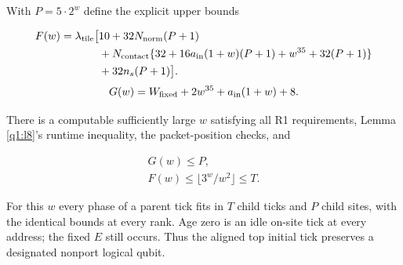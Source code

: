\begin{lemma}
With \(P=5\cdot 2^{w}\) define the explicit upper bounds

\begin{equation}\label{q1:e10.1}
\begin{aligned}
F(w)=\lambda_{\rm tile}\bigl[&10+32N_{\mathrm{norm}}(P+1)\\
 &+N_{\mathrm{contact}}\{32+16a_{\rm in}(1+w)(P+1)+w^{35}+32(P+1)\}\\
 &+32n_s(P+1)\bigr].
\end{aligned}
\end{equation}
\begin{equation}\label{q1:e10.2}
G(w)=W_{\rm fixed}+2w^{35}+a_{\rm in}(1+w)+8.
\end{equation}

There is a computable sufficiently large \(w\) satisfying all R1 requirements, Lemma \ref{q1:l8}'s runtime inequality, the packet-position checks, and

\begin{equation}\label{q1:e10.3}
\begin{gathered}
G(w)\le P, \\ F(w)\le \lfloor 3^{w}/w^{2}\rfloor\le T.
\end{gathered}
\end{equation}

For this \(w\) every phase of a parent tick fits in \(T\) child ticks and \(P\) child sites, with the identical bounds at every rank. Age zero is an idle on-site tick at every address; the fixed \(E\) still occurs. Thus the aligned top initial tick preserves a designated nonport logical qubit.

\end{lemma}
